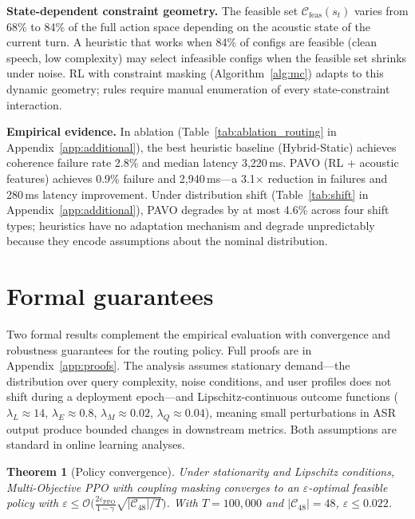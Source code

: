 \documentclass{article}
\newtheorem{theorem}{Theorem}
\begin{document}
\textbf{State-dependent constraint geometry.} The feasible set $\mathcal{C}_{\text{feas}}(s_t)$ varies from 68\% to 84\% of the full action space depending on the acoustic state of the current turn. A heuristic that works when 84\% of configs are feasible (clean speech, low complexity) may select infeasible configs when the feasible set shrinks under noise. RL with constraint masking (Algorithm~\ref{alg:mc}) adapts to this dynamic geometry; rules require manual enumeration of every state-constraint interaction.

\textbf{Empirical evidence.} In ablation (Table~\ref{tab:ablation_routing} in Appendix~\ref{app:additional}), the best heuristic baseline (Hybrid-Static) achieves coherence failure rate 2.8\% and median latency 3{,}220\,ms. PAVO (RL + acoustic features) achieves 0.9\% failure and 2{,}940\,ms---a 3.1$\times$ reduction in failures and 280\,ms latency improvement. Under distribution shift (Table~\ref{tab:shift} in Appendix~\ref{app:additional}), PAVO degrades by at most 4.6\% across four shift types; heuristics have no adaptation mechanism and degrade unpredictably because they encode assumptions about the nominal distribution.

\section{Formal guarantees}
\label{sec:theory}

Two formal results complement the empirical evaluation with convergence and robustness guarantees for the routing policy. Full proofs are in Appendix~\ref{app:proofs}. The analysis assumes stationary demand---the distribution over query complexity, noise conditions, and user profiles does not shift during a deployment epoch---and Lipschitz-continuous outcome functions ($\lambda_L\approx 14$, $\lambda_E\approx 0.8$, $\lambda_M\approx 0.02$, $\lambda_Q\approx 0.04$), meaning small perturbations in ASR output produce bounded changes in downstream metrics. Both assumptions are standard in online learning analyses.

\begin{theorem}[Policy convergence]
\label{thm:conv}
Under stationarity and Lipschitz conditions, Multi-Objective PPO with coupling masking converges to an $\varepsilon$-optimal feasible policy with $\varepsilon \leq \mathcal{O}\!\bigl(\frac{2\varepsilon_{\mathrm{PPO}}}{1-\gamma}\sqrt{|\mathcal{C}_{48}|/T}\bigr)$. With $T=100{,}000$ and $|\mathcal{C}_{48}|=48$, $\varepsilon\leq0.022$.
\end{theorem}
\end{document}
